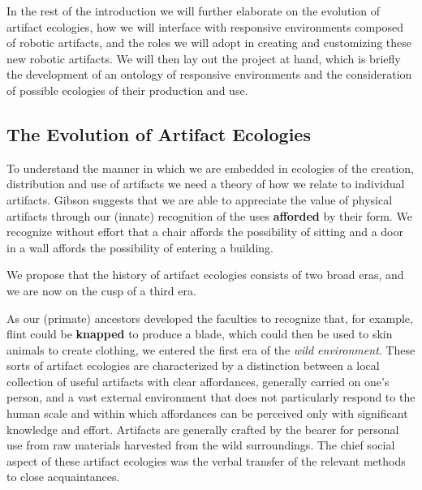 In the rest of the introduction we will further elaborate on the evolution of artifact ecologies, how we will interface with responsive environments composed of robotic artifacts, and the roles we will adopt in creating and customizing these new robotic artifacts.
We will then lay out the project at hand, which is briefly the development of an ontology of responsive environments and the consideration of possible ecologies of their production and use.

\subsection{The Evolution of Artifact Ecologies}
%
To understand the manner in which we are embedded in ecologies of the creation, distribution and use of artifacts we need a theory of how we relate to individual artifacts.
Gibson \citeyearpar{gibson_1979} suggests that we are able to appreciate the value of physical artifacts through our (innate) recognition of the uses \textbf{afforded} by their form.
We recognize without effort that a chair affords the possibility of sitting and a door in a wall affords the possibility of entering a building. 

We propose that the history of artifact ecologies consists of two broad eras, and we are now on the cusp of a third era.

As our (primate) ancestors developed the faculties to recognize that, for example, flint could be \textbf{knapped} to produce a blade, which could then be used to skin animals to create clothing, we entered the first era of the \emph{wild environment}. 
These sorts of artifact ecologies are characterized by a distinction between a local collection of useful artifacts with clear affordances, generally carried on one's person, and a vast external environment that does not particularly respond to the human scale and within which affordances can be perceived only with significant knowledge and effort.
Artifacts are generally crafted by the bearer for personal use from raw materials harvested from the wild surroundings. 
The chief social aspect of these artifact ecologies was the verbal transfer of the relevant methods to close acquaintances.

